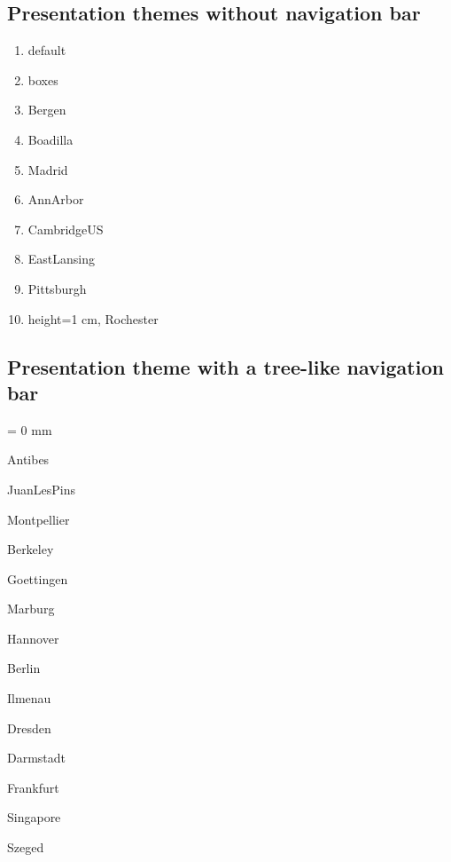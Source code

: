 \subsection{Presentation themes without navigation bar}
\begin{enumerate}
 \item default
 \item boxes
 \item Bergen
 \item Boadilla
 \item Madrid
 \item AnnArbor
 \item CambridgeUS
 \item EastLansing
 \item Pittsburgh
 \item height=1 cm, Rochester
\end{enumerate}

\subsection{Presentation theme with a tree-like navigation bar}
\columnseprule = 0 mm
\begin{enumerate}
\begin{multicols}{2}
 \item Antibes
 \item JuanLesPins
 \item Montpellier
 \item Berkeley
 \item Goettingen
 \item Marburg
 \item Hannover
 \item Berlin
 \item Ilmenau
 \item Dresden
 \item Darmstadt
 \item Frankfurt
 \item Singapore
 \item Szeged
\end{multicols}
\end{enumerate}

